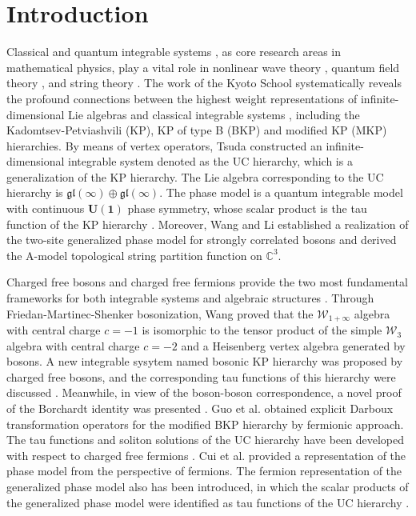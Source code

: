 \documentclass[11pt,reqno]{amsart}
\numberwithin{equation}{section}
\begin{document}
\section{Introduction}
Classical and quantum integrable systems \cite{quantumphysics,integrable_quantum,introduction_integrablesystem}, as core research areas in mathematical physics, play a vital role in nonlinear wave theory \cite{integrable_wave}, quantum field theory \cite{integrable_QFT}, and string theory \cite{integrable_string}. The work of the Kyoto School systematically reveals the profound connections between the highest weight representations of infinite-dimensional Lie algebras and  classical integrable systems \cite{Jimbo82,Jimbo2,Kac2013}, including the Kadomtsev-Petviashvili (KP), KP of type B (BKP) and modified KP (MKP) hierarchies. By means of vertex operators, Tsuda \cite{UC} constructed an infinite-dimensional integrable system denoted as the UC hierarchy, which is a generalization of the KP hierarchy. The Lie algebra corresponding to the UC hierarchy is $\mathfrak{gl}(\infty)\oplus \mathfrak{gl}(\infty)$. The phase model is a quantum integrable model with continuous $\mathbf{U(1)}$ phase symmetry, whose scalar product is the tau function of the KP hierarchy \cite{Wheeler}. Moreover, Wang and Li \cite{GPM2019} established a realization of the two-site generalized phase model for strongly correlated bosons and derived the A-model topological string partition function on $\mathbb{C}^{3}$.


Charged free bosons and charged free fermions provide the two most fundamental frameworks for both integrable systems and algebraic structures \cite{Jimbo2000,boson_integrable}. Through Friedan-Martinec-Shenker bosonization, Wang \cite{Walgrbra_boson} proved that the $\mathcal{W}_{1+\infty}$ algebra with central charge $c=-1$ is isomorphic to the tensor product of the simple $\mathcal{W}_{3}$ algebra with central charge $c=-2$ and a Heisenberg vertex algebra generated by bosons. A new integrable sysytem named bosonic KP hierarchy was proposed by charged free bosons, and the corresponding tau functions of this hierarchy were discussed \cite{boson_hierarchy}. Meanwhile, in view of  the boson-boson correspondence, a novel proof of the Borchardt identity was presented \cite{tau_function_boson}. Guo et al. \cite{mBKP_fermoinic} obtained explicit Darboux transformation operators for the modified BKP hierarchy by  fermionic approach. The tau functions and soliton solutions of the UC hierarchy have been developed with  respect to charged free fermions \cite{UC_fermion}. Cui et al. \cite{PM_fermion} provided a representation of the phase model from the perspective of fermions. The fermion representation of the generalized phase model also has been introduced, in which the scalar products of  the generalized phase model were identified as tau functions of the UC hierarchy \cite{GPM_fermion}.
\end{document}
